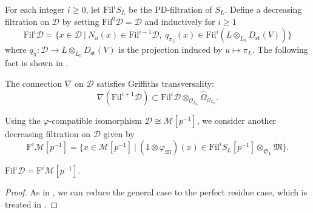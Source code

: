 For each integer $i \geq 0$, let $\mathrm{Fil}^i S_L$ be the PD-filtration of $S_L$. Define a decreasing filtration on $\mathscr{D}$ by setting $\mathrm{Fil}^0 \mathscr{D} = \mathscr{D}$ and inductively for $i \geq 1$ 
\[
\mathrm{Fil}^i \mathscr{D} = \{x \in \mathscr{D} ~|~ N_u(x) \in \mathrm{Fil}^{i-1} \mathscr{D}, ~q_{\pi_L}(x) \in \mathrm{Fil}^i(L\otimes_{L_0} D_{\mathrm{st}}(V))\}
\]
where $q_{\pi}\colon \mathscr{D} \rightarrow L\otimes_{L_0} D_{\mathrm{st}}(V)$ is the projection induced by $u\mapsto \pi_L$. The following fact is shown in \cite{moon-strly-div-latt-cryst-cohom-CDVF}.

\begin{lem} \label{lem:Griffiths-transversality-CDVR}
The connection $\nabla$ on $\mathscr{D}$ satisfies Griffiths transversality:
\[
\nabla(\mathrm{Fil}^{i+1} \mathscr{D}) \subset \mathrm{Fil}^i \mathscr{D}\otimes_{\mathcal{O}_{L_0}} \widehat{\Omega}_{\mathcal{O}_{L_0}}.
\]
\end{lem}

Using the $\varphi$-compatible isomorphism $\mathscr{D} \cong \mathscr{M}[p^{-1}]$, we consider another decreasing filtration on $\mathscr{D}$ given by 
\[
\mathrm{F}^i \mathscr{M}[p^{-1}] = \{x \in \mathscr{M}[p^{-1}] ~|~ (1\otimes \varphi_{\mathfrak{M}})(x) \in \mathrm{Fil}^i S_L[p^{-1}]\otimes_{\mathfrak{S}_L} \mathfrak{M}\}. 
\]

\begin{lem} \label{lem:filtrations-compatible}
$\mathrm{Fil}^i \mathscr{D} = \mathrm{F}^i \mathscr{M}[p^{-1}]$.
\end{lem}

\begin{proof}
As in \cite[Lem.~4.15, Pf.]{du-liu-moon-shimizu-completed-prismatic-F-crystal-loc-system}, we can reduce the general case to the perfect residue case, which is treated in \cite[Cor.~3.2.3, Pf.]{liu-semistable-lattice-breuil}. 
\end{proof}


